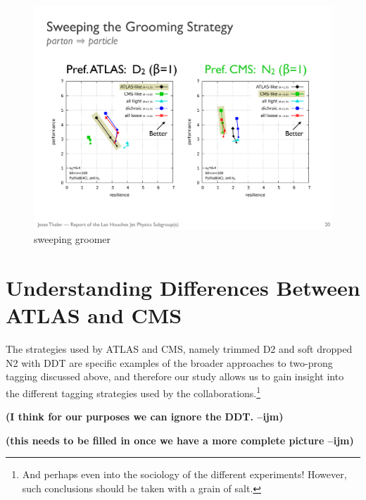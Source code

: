 \documentclass[11pt,letterpaper]{article}
\newcommand{\ijm}[1]{\textbf{\textcolor{llblue}{(#1 --ijm)}}}
\begin{document}
\begin{figure}
\begin{center}
\includegraphics[width=0.75\columnwidth]{figures/sweep_groom}
\end{center}
\caption{sweeping groomer}
\label{fig:nolabel}
\end{figure}






\section{Understanding Differences Between ATLAS and CMS}\label{sec:exp_compare}

The strategies used by ATLAS and CMS, namely trimmed  D2 \cite{Larkoski:2015kga}\cite{Larkoski:2014gra} and soft dropped N2 \cite{Moult:2016cvt} with DDT \cite{Dolen:2016kst} are specific examples of the broader approaches to two-prong tagging discussed above, and therefore our study allows us to gain insight into the different tagging strategies used by the collaborations.\footnote{And perhaps even into the sociology of the different experiments! However, such conclusions should be taken with a grain of salt.}

\ijm{I think for our purposes we can ignore the DDT. }

\ijm{this needs to be filled in once we have a more complete picture}
\end{document}
